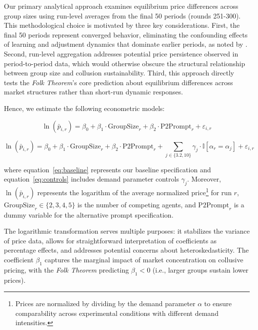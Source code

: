 Our primary analytical approach examines equilibrium price differences across group sizes using run-level averages from the final 50 periods (rounds 251-300). This methodological choice is motivated by three key considerations. First, the final 50 periods represent converged behavior, eliminating the confounding effects of learning and adjustment dynamics that dominate earlier periods, as noted by \textcite{fish_algorithmic_2025}. Second, run-level aggregation addresses potential price persistence observed in period-to-period data, which would otherwise obscure the structural relationship between group size and collusion sustainability. Third, this approach directly tests the \emph{Folk Theorem}'s core prediction about equilibrium differences across market structures rather than short-run dynamic responses.

Hence, we estimate the following econometric models:

\begin{equation}\label{eq:baseline}
    \ln(\bar{p}_{i,r}) = \beta_0 + \beta_1 \cdot \text{GroupSize}_r + \beta_2 \cdot \text{P2Prompt}_r + \varepsilon_{i,r}
\end{equation}

\begin{equation}\label{eq:controls}
    \ln(\bar{p}_{i,r}) = \beta_0 + \beta_1 \cdot \text{GroupSize}_r + \beta_2 \cdot \text{P2Prompt}_r + \sum_{j \in \{3.2, 10\}} \gamma_j \cdot \mathbb{I}[\alpha_r = \alpha_j] + \varepsilon_{i,r}
\end{equation}

where equation~\eqref{eq:baseline} represents our baseline specification and equation~\eqref{eq:controls} includes demand parameter controls $\gamma_j$. Moreover, $\ln(\bar{p}_{i,r})$ represents the logarithm of the average normalized price\footnote{Prices are normalized by dividing by the demand parameter $\alpha$ to ensure comparability across experimental conditions with different demand intensities.} for run $r$, $\text{GroupSize}_r \in \{2,3,4,5\}$ is the number of competing agents, and $\text{P2Prompt}_r$ is a dummy variable for the alternative prompt specification.

The logarithmic transformation serves multiple purposes: it stabilizes the variance of price data, allows for straightforward interpretation of coefficients as percentage effects, and addresses potential concerns about heteroskedasticity. The coefficient $\beta_1$ captures the marginal impact of market concentration on collusive pricing, with the \emph{Folk Theorem} predicting $\beta_1 < 0$ (i.e., larger groups sustain lower prices).

